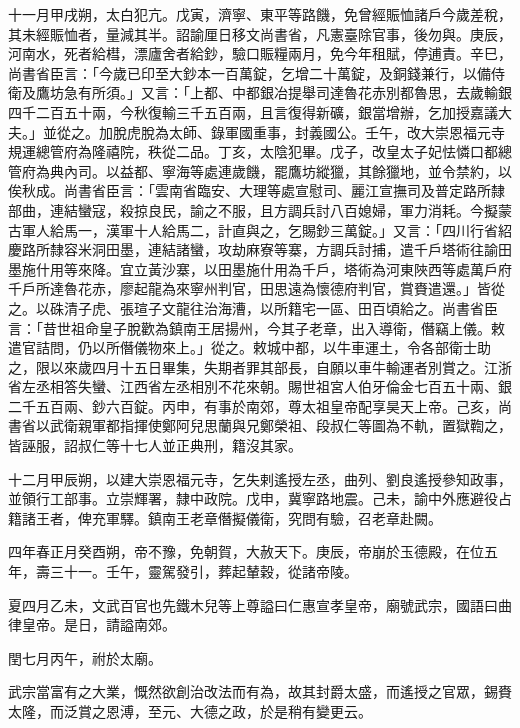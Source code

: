 \begin{pinyinscope}
 十一月甲戌朔，太白犯亢。戊寅，濟寧、東平等路饑，免曾經賑恤諸戶今歲差稅，其未經賑恤者，量減其半。詔諭厘日移文尚書省，凡憲臺除官事，後勿與。庚辰，河南水，死者給槥，漂廬舍者給鈔，驗口賑糧兩月，免今年租賦，停逋責。辛巳，尚書省臣言：「今歲已印至大鈔本一百萬錠，乞增二十萬錠，及銅錢兼行，以備侍衛及鷹坊急有所須。」又言：「上都、中都銀冶提舉司達魯花赤別都魯思，去歲輸銀四千二百五十兩，今秋復輸三千五百兩，且言復得新礦，銀當增辦，乞加授嘉議大夫。」並從之。加脫虎脫為太師、錄軍國重事，封義國公。壬午，改大崇恩福元寺規運總管府為隆禧院，秩從二品。丁亥，太陰犯畢。戊子，改皇太子妃怯憐口都總管府為典內司。以益都、寧海等處連歲饑，罷鷹坊縱獵，其餘獵地，並令禁約，以俟秋成。尚書省臣言：「雲南省臨安、大理等處宣慰司、麗江宣撫司及普定路所隸部曲，連結蠻寇，殺掠良民，諭之不服，且方調兵討八百媳婦，軍力消耗。今擬蒙古軍人給馬一，漢軍十人給馬二，計直與之，乞賜鈔三萬錠。」又言：「四川行省紹慶路所隸容米洞田墨，連結諸蠻，攻劫麻寮等寨，方調兵討捕，遣千戶塔術往諭田墨施什用等來降。宜立黃沙寨，以田墨施什用為千戶，塔術為河東陜西等處萬戶府千戶所達魯花赤，廖起龍為來寧州判官，田思遠為懷德府判官，賞賚遣還。」皆從之。以硃清子虎、張瑄子文龍往治海漕，以所籍宅一區、田百頃給之。尚書省臣言：「昔世祖命皇子脫歡為鎮南王居揚州，今其子老章，出入導衛，僭竊上儀。敕遣官詰問，仍以所僭儀物來上。」從之。敕城中都，以牛車運土，令各部衛士助之，限以來歲四月十五日畢集，失期者罪其部長，自願以車牛輸運者別賞之。江浙省左丞相答失蠻、江西省左丞相別不花來朝。賜世祖宮人伯牙倫金七百五十兩、銀二千五百兩、鈔六百錠。丙申，有事於南郊，尊太祖皇帝配享昊天上帝。己亥，尚書省以武衛親軍都指揮使鄭阿兒思蘭與兄鄭榮祖、段叔仁等圖為不軌，置獄鞫之，皆誣服，詔叔仁等十七人並正典刑，籍沒其家。



 十二月甲辰朔，以建大崇恩福元寺，乞失剌遙授左丞，曲列、劉良遙授參知政事，並領行工部事。立崇輝署，隸中政院。戊申，冀寧路地震。己未，諭中外應避役占籍諸王者，俾充軍驛。鎮南王老章僭擬儀衛，究問有驗，召老章赴闕。



 四年春正月癸酉朔，帝不豫，免朝賀，大赦天下。庚辰，帝崩於玉德殿，在位五年，壽三十一。壬午，靈駕發引，葬起輦穀，從諸帝陵。



 夏四月乙未，文武百官也先鐵木兒等上尊謚曰仁惠宣孝皇帝，廟號武宗，國語曰曲律皇帝。是日，請謚南郊。



 閏七月丙午，祔於太廟。



 武宗當富有之大業，慨然欲創治改法而有為，故其封爵太盛，而遙授之官眾，錫賚太隆，而泛賞之恩溥，至元、大德之政，於是稍有變更云。



\end{pinyinscope}